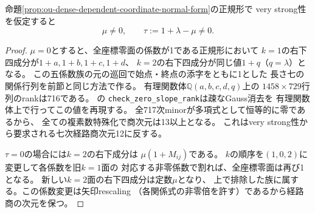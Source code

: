 \begin{lemma}[定数面を持つ族の七次障害]
\label{lem:ou-dense-constant-face-obstruction}
命題\ref{prop:ou-dense-dependent-coordinate-normal-form}の正規形で
very strong性を仮定すると
\[
 \mu\ne0,\qquad \tau:=1+\lambda-\mu\ne0.
\]
\end{lemma}
\begin{proof}
$\mu=0$とすると、全座標零面の係数が1である正規形において
$k=1$の右下四成分が$1+a,1+b,1+c,1+d$、
$k=2$の右下四成分が同じ値$1+q$（$q=\lambda$）となる。
この五係数族の元の巡回で始点・終点の添字をともに1とした
長さ七の関係行列を前節と同じ方法で作る。
有理関数体$\mathbb Q(a,b,c,d,q)$上の
$1458\times729$行列のrankは716である。
の
\texttt{check\_zero\_slope\_rank}は疎なGauss消去を
有理関数体上で行ってこの値を再現する。
全717次minorが多項式として恒等的に零であるから、
全ての複素数特殊化で商次元は13以上となる。
これはvery strong性から要求される七次経路商次元12に反する。

$\tau=0$の場合には$k=2$の右下成分は
$\mu(1+M_{ij})$である。
$k$の順序を$(1,0,2)$に変更して各係数を旧$k=1$面の
対応する非零係数で割れば、全座標零面は再び1となる。
新しい$k=2$面の右下四成分は定数$\mu$となり、
上で排除した族に属する。この係数変更は矢印rescaling
（各関係式の非零倍を許す）であるから経路商の次元を保つ。
\end{proof}


